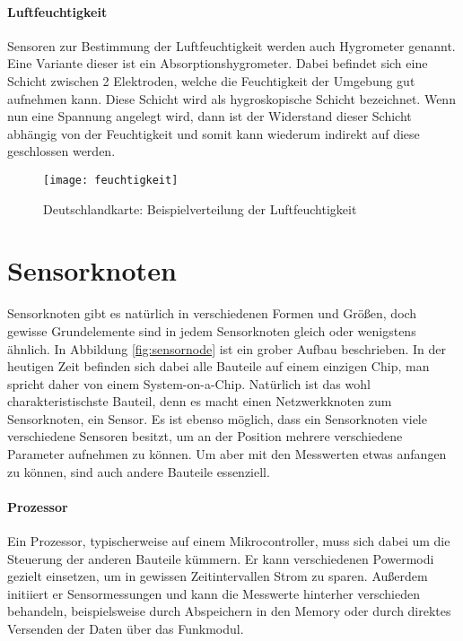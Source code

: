 \paragraph{Luftfeuchtigkeit}

Sensoren zur Bestimmung der Luftfeuchtigkeit werden auch Hygrometer genannt. Eine Variante dieser ist ein Absorptionshygrometer. Dabei befindet sich eine Schicht zwischen 2 Elektroden, welche die Feuchtigkeit der Umgebung gut aufnehmen kann. Diese Schicht wird als hygroskopische Schicht bezeichnet. Wenn nun eine Spannung angelegt wird, dann ist der Widerstand dieser Schicht abhängig von der Feuchtigkeit und somit kann wiederum indirekt auf diese geschlossen werden.

\begin{figure}[htbp]
\centering
\caption{Deutschlandkarte: Beispielverteilung der Luftfeuchtigkeit}
\label{fig:feuchtigkeit}
\texttt{[image: feuchtigkeit]}
\end{figure}

\section{Sensorknoten}

Sensorknoten gibt es natürlich in verschiedenen Formen und Größen, doch gewisse Grundelemente sind in jedem Sensorknoten gleich oder wenigstens ähnlich. In Abbildung \ref{fig:sensornode} ist ein grober Aufbau beschrieben. In der heutigen Zeit befinden sich dabei alle Bauteile auf einem einzigen Chip, man spricht daher von einem System-on-a-Chip.\newline
Natürlich ist das wohl charakteristischste Bauteil, denn es macht einen Netzwerkknoten zum Sensorknoten, ein Sensor. Es ist ebenso möglich, dass ein Sensorknoten viele verschiedene Sensoren besitzt, um an der Position mehrere verschiedene Parameter aufnehmen zu können.\newline
Um aber mit den Messwerten etwas anfangen zu können, sind auch andere Bauteile essenziell. 

\paragraph{Prozessor} Ein Prozessor, typischerweise auf einem Mikrocontroller, muss sich dabei um die Steuerung der anderen Bauteile kümmern. Er kann verschiedenen Powermodi gezielt einsetzen, um in gewissen Zeitintervallen Strom zu sparen. Außerdem initiiert er Sensormessungen und kann die Messwerte hinterher verschieden behandeln, beispielsweise durch Abspeichern in den Memory oder durch direktes Versenden der Daten über das Funkmodul.
